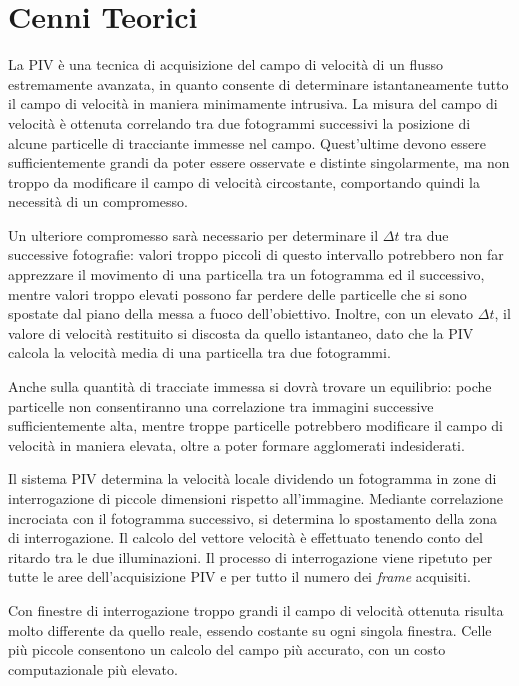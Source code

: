 \documentclass{article} %
\begin{document}
\section{Cenni Teorici}
La PIV è una tecnica di acquisizione del campo di velocità di un flusso estremamente avanzata, in quanto consente di determinare istantaneamente tutto il campo di velocità in maniera minimamente intrusiva. La misura del campo di velocità è ottenuta correlando tra due fotogrammi successivi la posizione di alcune particelle di tracciante immesse nel campo. Quest'ultime devono essere sufficientemente grandi da poter essere osservate e distinte singolarmente, ma non troppo da modificare il campo di velocità circostante, comportando quindi la necessità di un compromesso.\par
Un ulteriore compromesso sarà necessario per determinare il $\Delta t$ tra due successive fotografie: valori troppo piccoli di questo intervallo potrebbero non far apprezzare il movimento di una particella tra un fotogramma ed il successivo, mentre valori troppo elevati possono far perdere delle particelle che si sono spostate dal piano della messa a fuoco dell'obiettivo. Inoltre, con un elevato $\Delta t$, il valore di velocità restituito si discosta da quello istantaneo, dato che la PIV calcola la velocità media di una particella tra due fotogrammi.\par
Anche sulla quantità di tracciate immessa si dovrà trovare un equilibrio: poche particelle non consentiranno una correlazione tra immagini successive sufficientemente alta, mentre troppe particelle potrebbero modificare il campo di velocità in maniera elevata, oltre a poter formare agglomerati indesiderati.\par
Il sistema PIV determina la velocità locale dividendo un fotogramma in zone di interrogazione di piccole dimensioni rispetto all'immagine. Mediante correlazione incrociata con il fotogramma successivo, si determina lo spostamento della zona di interrogazione. Il calcolo del vettore velocità è effettuato tenendo conto del ritardo tra le due illuminazioni. Il processo di interrogazione viene ripetuto per tutte le aree dell'acquisizione PIV e per tutto il numero dei \textit{frame} acquisiti.\par
Con finestre di interrogazione troppo grandi il campo di velocità ottenuta risulta molto differente da quello reale, essendo costante su ogni singola finestra. Celle più piccole consentono un calcolo del campo più accurato, con un costo computazionale più elevato.
\end{document}
